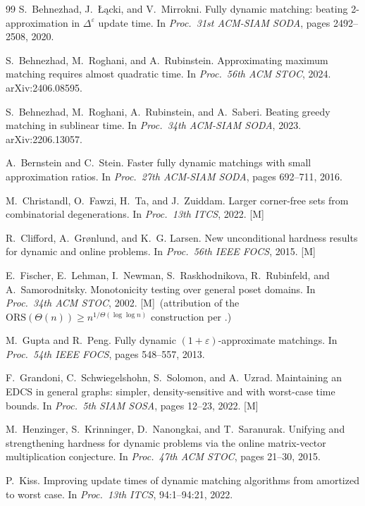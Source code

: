 \documentclass[11pt]{article}
\theoremstyle{definition}
\theoremstyle{remark}
\newcommand{\statusM}{\textcolor{orange!80!black}{\textsf{[M]}}}
\newcommand{\ORS}{\mathrm{ORS}}
\newcommand{\eps}{\varepsilon}
\begin{document}
\begin{thebibliography}{99}
S.~Behnezhad, J.~\L{}\k{a}cki, and V.~Mirrokni.
Fully dynamic matching: beating 2-approximation in $\Delta^{\eps}$
update time.
In \emph{Proc.\ 31st ACM-SIAM SODA}, pages 2492--2508, 2020.

S.~Behnezhad, M.~Roghani, and A.~Rubinstein.
Approximating maximum matching requires almost quadratic time.
In \emph{Proc.\ 56th ACM STOC}, 2024. arXiv:2406.08595.

S.~Behnezhad, M.~Roghani, A.~Rubinstein, and A.~Saberi.
Beating greedy matching in sublinear time.
In \emph{Proc.\ 34th ACM-SIAM SODA}, 2023. arXiv:2206.13057.

A.~Bernstein and C.~Stein.
Faster fully dynamic matchings with small approximation ratios.
In \emph{Proc.\ 27th ACM-SIAM SODA}, pages 692--711, 2016.

M.~Christandl, O.~Fawzi, H.~Ta, and J.~Zuiddam.
Larger corner-free sets from combinatorial degenerations.
In \emph{Proc.\ 13th ITCS}, 2022. \statusM

R.~Clifford, A.~Gr{\o}nlund, and K.~G. Larsen.
New unconditional hardness results for dynamic and online problems.
In \emph{Proc.\ 56th IEEE FOCS}, 2015. \statusM

E.~Fischer, E.~Lehman, I.~Newman, S.~Raskhodnikova, R.~Rubinfeld, and
A.~Samorodnitsky.
Monotonicity testing over general poset domains.
In \emph{Proc.\ 34th ACM STOC}, 2002. \statusM\ (attribution of the
$\ORS(\Theta(n))\ge n^{1/\Theta(\log\log n)}$ construction per
\cite{BG24}.)

M.~Gupta and R.~Peng.
Fully dynamic $(1+\eps)$-approximate matchings.
In \emph{Proc.\ 54th IEEE FOCS}, pages 548--557, 2013.

F.~Grandoni, C.~Schwiegelshohn, S.~Solomon, and A.~Uzrad.
Maintaining an EDCS in general graphs: simpler, density-sensitive and
with worst-case time bounds.
In \emph{Proc.\ 5th SIAM SOSA}, pages 12--23, 2022. \statusM

M.~Henzinger, S.~Krinninger, D.~Nanongkai, and T.~Saranurak.
Unifying and strengthening hardness for dynamic problems via the online
matrix-vector multiplication conjecture.
In \emph{Proc.\ 47th ACM STOC}, pages 21--30, 2015.

P.~Kiss.
Improving update times of dynamic matching algorithms from amortized to
worst case.
In \emph{Proc.\ 13th ITCS}, 94:1--94:21, 2022.


\end{thebibliography}
\end{document}
